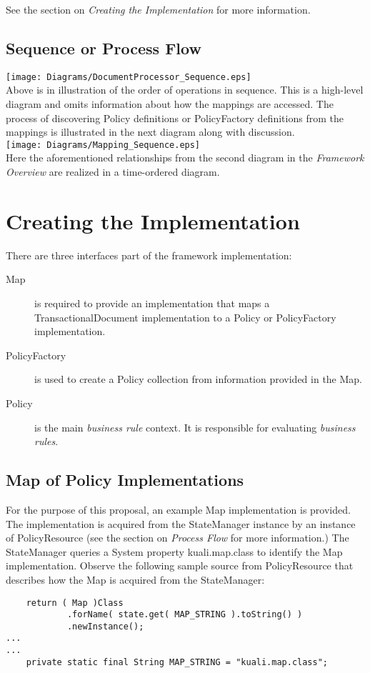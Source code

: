 \documentclass[12pt]{article}
\begin{document}
See the section on \emph{Creating the Implementation} for more information. 

  \subsection{Sequence or Process Flow}

  \texttt{[image: Diagrams/DocumentProcessor\_Sequence.eps]} \\

  Above is in illustration of the order of operations in sequence. This is a
high-level diagram and omits information about how the mappings are accessed. 
The process of discovering \sf Policy \rm definitions or
\sf PolicyFactory \rm definitions from the mappings is illustrated in the next
diagram along with discussion. \\

  \texttt{[image: Diagrams/Mapping\_Sequence.eps]} \\

  Here the aforementioned relationships from the second diagram in 
the \emph{Framework Overview} are realized in a time-ordered diagram.

  \section{Creating the Implementation}
  There are three interfaces part of the framework implementation:
\begin{description}
  \item[Map] is required to provide an implementation that maps a 
\sf TransactionalDocument \rm implementation to a \sf Policy \rm or
 \sf PolicyFactory \rm implementation.
  \item[PolicyFactory] is used to create a \sf Policy \rm collection from
information provided in the \sf Map\rm.
  \item[Policy] is the main \emph{business rule} context. It is responsible
for evaluating \emph{business rules}.
\end{description}
  \subsection{Map of Policy Implementations}
  For the purpose of this proposal, an example \sf Map \rm implementation is
provided. The implementation is acquired from the \sf StateManager \rm
instance \sf by an instance of \sf PolicyResource \rm (see the section on
\emph{Process Flow} for more information.) The 
\sf StateManager \rm queries a \sf System \rm property \sf kuali.map.class \rm
to identify the \sf Map \rm implementation. Observe the following sample 
source from \sf PolicyResource \rm that describes how the \sf Map \rm is
acquired from the \sf StateManager\rm: 
  \sf \begin{verbatim} 
    return ( Map )Class
            .forName( state.get( MAP_STRING ).toString() )
            .newInstance();
...
...
    private static final String MAP_STRING = "kuali.map.class";

  \end{verbatim} \rm 
\end{document}
